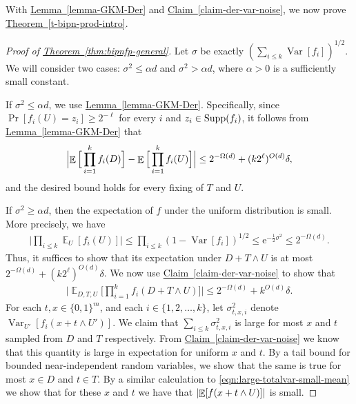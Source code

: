 \documentclass[11pt]{article}
\numberwithin{equation}{section}
\theoremstyle{definition}
\theoremstyle{plain}
\newcommand{\eee}{\mathrm e}
\newcommand{\expref}[2]{\hyperref[#2]{#1~\ref{#2}}}
\newcommand{\zo}{\{0,1\}}
\def\Blocklength{\ell}
\def\Supp{\textnormal{Supp}}
\DeclarePairedDelimiter{\abs}{\lvert}{\rvert}
\DeclareMathOperator*{\E}{\mathbb{E}}                 %
\DeclareMathOperator*{\Var}{Var}                 %
\begin{document}
  With \expref{Lemma}{lemma-GKM-Der} and \expref{Claim}{claim-der-var-noise}, we now prove \expref{Theorem}{t-bipn-prod-intro}.

\begin{proof}[Proof of {\expref{Theorem}{thm:bipnfp-general}}]
    Let $\sigma$ be exactly $(\sum_{i \le k} \Var[f_i])^{1/2}$.
    We will consider two cases:  $\sigma^2 \le \alpha d$ and $\sigma^2 > \alpha d$, where $\alpha > 0$ is a sufficiently small constant.

    If $\sigma^2 \le \alpha d$, we use \expref{Lemma}{lemma-GKM-Der}.
    Specifically, since $\Pr[f_i(U) = z_i] \ge 2^{-\Blocklength}$ for every $i$ and $z_i \in \Supp(f_i)$, it follows from \expref{Lemma}{lemma-GKM-Der} that
    \[
      \Bigl| \E \Big[ \prod_{i=1}^k f_i(D) \Big] - \E \Big[ \prod_{i=1}^k f_i(U) \Big] \Bigr|
      \le 2^{-\Omega(d)} + (k 2^\Blocklength)^{O(d)} \delta ,
    \]
    and the desired bound holds for every fixing of $T$ and $U$.

    \medskip

    If $\sigma^2 \ge \alpha d$, then the expectation of $f$ under the uniform distribution is small.
		More precisely, we have
		\begin{align} \label{eqn:large-totalvar-small-mean}
      \Big| \prod_{i \le k} \E_{U}[f_i(U)] \Big|
      \le \prod_{i \le k} (1 - \Var[f_i])^{1/2} 
      \le \eee^{-\frac{1}{2} \sigma^2} 
      \le 2^{-\Omega(d)} .
		\end{align}
    Thus, it suffices to show that its expectation under $D + T \wedge U$ is at most $2^{-\Omega(d)} + (k 2^\Blocklength)^{O(d)} \delta$.
		We now use \expref{Claim}{claim-der-var-noise} to show that
    \begin{align*}
      \Big| \E_{D,T,U} \Big[ \prod_{i=1}^k f_i(D + T \wedge U) \Big] \Big|
      \le 2^{-\Omega(d)} + k^{O(d)} \delta . 
    \end{align*}
    For each $t, x \in \zo^m$, and each $i \in \{1, 2, \ldots, k\}$, let $\sigma_{t, x, i}^2$ denote $\Var_{U'} [f_i(x + t \wedge U')]$.
		We claim that $\sum_{i \le k} \sigma_{t,x,i}^2$ is large for most $x$ and $t$ sampled from $D$ and $T$ respectively.  {}From \expref{Claim}{claim-der-var-noise} we know that this quantity is large in expectation for uniform $x$ and $t$.
    By a tail bound for bounded near-independent random variables, we show that the same is true for most $x \in D$ and $t \in T$.
		By a similar calculation to \eqref{eqn:large-totalvar-small-mean} we show that for these $x$ and $t$ we have that $\abs{\E[f(x + t \wedge U)]}$ is small.


\end{proof}
\end{document}
